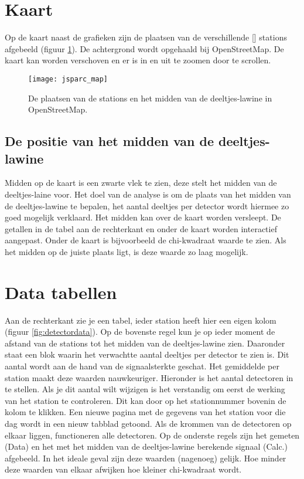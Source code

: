 \section{Kaart}

Op de kaart naast de grafieken zijn de plaatsen van de verschillende [\hisparc] stations
afgebeeld (figuur \ref{fig:core}). De achtergrond wordt opgehaald bij OpenStreetMap. De kaart kan 
worden verschoven en er is in en uit te zoomen door te scrollen.

\begin{figure}[ht]
    \centering
    \texttt{[image: jsparc\_map]}
    \caption{De plaatsen van de stations en het midden van de deeltjes-lawine in OpenStreetMap.}
    \label{fig:core}
\end{figure}

\subsection{De positie van het midden van de deeltjes-lawine}

Midden op de kaart is een zwarte vlek te zien, deze stelt het midden van de 
deeltjes-laine voor. Het doel van de analyse is om de plaats van het midden 
van de deeltjes-lawine te bepalen, het aantal deeltjes per detector wordt 
hiermee zo goed mogelijk verklaard. Het midden kan over de kaart worden 
versleept. De getallen in de tabel aan de rechterkant en onder de kaart worden 
interactief aangepast. Onder de kaart is bijvoorbeeld de chi-kwadraat waarde 
te zien. Als het midden op de juiste plaats ligt, is deze waarde zo laag 
mogelijk.


\section{Data tabellen}

Aan de rechterkant zie je een tabel, ieder station heeft hier een eigen kolom 
(figuur \ref{fig:detectordata}).
Op de bovenste regel kun je op ieder moment de afstand van de stations tot 
het midden van de deeltjes-lawine zien. Daaronder staat een blok waarin het 
verwachtte aantal deeltjes per detector te zien is. Dit aantal wordt aan de 
hand van de signaalsterkte geschat. Het gemiddelde per station maakt deze 
waarden nauwkeuriger. Hieronder is het aantal detectoren in te stellen. Als je 
dit aantal wilt wijzigen is het verstandig om eerst de werking van het station 
te controleren. Dit kan door op het stationnummer bovenin de kolom te klikken. 
Een nieuwe pagina met de gegevens van het station voor die dag wordt in een 
nieuw tabblad getoond. Als de krommen van de detectoren op elkaar liggen, 
functioneren alle detectoren.
Op de onderste regels zijn het gemeten (Data) en het met het midden van de 
deeltjes-lawine berekende signaal (Calc.) afgebeeld. In het ideale geval zijn 
deze waarden (nagenoeg) gelijk. 
Hoe minder deze waarden van elkaar afwijken hoe kleiner chi-kwadraat wordt.


